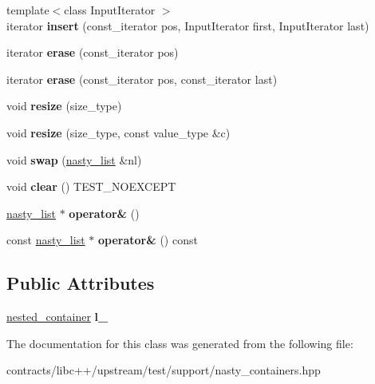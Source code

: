 \begin{DoxyCompactItemize}
\mbox{\label{classnasty__list_a7547f826bfc3e72634aff4cd8ab5eb14}} 
{\footnotesize template$<$class Input\+Iterator $>$ }\\iterator {\bfseries insert} (const\+\_\+iterator pos, Input\+Iterator first, Input\+Iterator last)
\item 
\mbox{\label{classnasty__list_ab0ac473e9252f481c709971382d4f709}} 
iterator {\bfseries erase} (const\+\_\+iterator pos)
\item 
\mbox{\label{classnasty__list_aaeacb44424af05d15ace513138f383d7}} 
iterator {\bfseries erase} (const\+\_\+iterator pos, const\+\_\+iterator last)
\item 
\mbox{\label{classnasty__list_a3d1eaeb10f257a689f17c128fd5159ca}} 
void {\bfseries resize} (size\+\_\+type)
\item 
\mbox{\label{classnasty__list_a89fb6dab774e9d6cc4716b7c5e1c4937}} 
void {\bfseries resize} (size\+\_\+type, const value\+\_\+type \&c)
\item 
\mbox{\label{classnasty__list_a3371202714f3413cf1c760e09130bd5a}} 
void {\bfseries swap} (\mbox{\hyperlink{classnasty__list}{nasty\+\_\+list}} \&nl)
\item 
\mbox{\label{classnasty__list_a4ad629e6b7ce77d42bdf8d4c725d4ad4}} 
void {\bfseries clear} () T\+E\+S\+T\+\_\+\+N\+O\+E\+X\+C\+E\+PT
\item 
\mbox{\label{classnasty__list_a00b9b767fc01a588df28b524436156a5}} 
\mbox{\hyperlink{classnasty__list}{nasty\+\_\+list}} $\ast$ {\bfseries operator\&} ()
\item 
\mbox{\label{classnasty__list_ab78d3a06f99232fd88b14ca90cd0f821}} 
const \mbox{\hyperlink{classnasty__list}{nasty\+\_\+list}} $\ast$ {\bfseries operator\&} () const
\end{DoxyCompactItemize}
\subsection*{Public Attributes}
\begin{DoxyCompactItemize}
\item 
\mbox{\label{classnasty__list_ac477eb7998c9aba3100d9c49780ce427}} 
\mbox{\hyperlink{classstd_1_1list}{nested\+\_\+container}} {\bfseries l\+\_\+}
\end{DoxyCompactItemize}


The documentation for this class was generated from the following file\+:\begin{DoxyCompactItemize}
\item 
contracts/libc++/upstream/test/support/nasty\+\_\+containers.\+hpp\end{DoxyCompactItemize}
